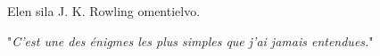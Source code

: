 Elen sila J. K. Rowling omentielvo.

"\emph{C'est une des énigmes les plus simples que j'ai jamais entendues.}"

